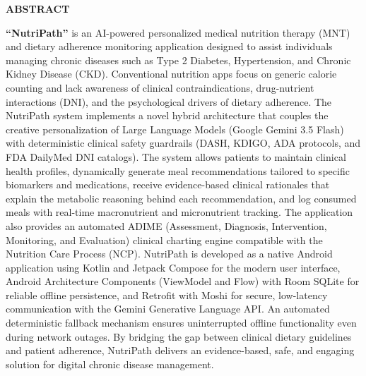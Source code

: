 \documentclass[a4paper,12pt]{report}
\let\mtcontentsname\contentsname
\renewcommand\contentsname{\MakeUppercase\mtcontentsname}
\begin{document}
\begin{center}
    \Large\textbf{ABSTRACT}
\end{center}
\vspace{1cm}
\textbf{``NutriPath''} is an AI-powered personalized medical nutrition therapy (MNT) and dietary adherence monitoring application designed to assist individuals managing chronic diseases such as Type 2 Diabetes, Hypertension, and Chronic Kidney Disease (CKD). Conventional nutrition apps focus on generic calorie counting and lack awareness of clinical contraindications, drug-nutrient interactions (DNI), and the psychological drivers of dietary adherence. The NutriPath system implements a novel hybrid architecture that couples the creative personalization of Large Language Models (Google Gemini 3.5 Flash) with deterministic clinical safety guardrails (DASH, KDIGO, ADA protocols, and FDA DailyMed DNI catalogs). The system allows patients to maintain clinical health profiles, dynamically generate meal recommendations tailored to specific biomarkers and medications, receive evidence-based clinical rationales that explain the metabolic reasoning behind each recommendation, and log consumed meals with real-time macronutrient and micronutrient tracking. The application also provides an automated ADIME (Assessment, Diagnosis, Intervention, Monitoring, and Evaluation) clinical charting engine compatible with the Nutrition Care Process (NCP). NutriPath is developed as a native Android application using Kotlin and Jetpack Compose for the modern user interface, Android Architecture Components (ViewModel and Flow) with Room SQLite for reliable offline persistence, and Retrofit with Moshi for secure, low-latency communication with the Gemini Generative Language API. An automated deterministic fallback mechanism ensures uninterrupted offline functionality even during network outages. By bridging the gap between clinical dietary guidelines and patient adherence, NutriPath delivers an evidence-based, safe, and engaging solution for digital chronic disease management.

\vspace{0.5cm}
\clearpage
\newpage

\tableofcontents
\renewcommand*\contentsname{CONTENTS}

\newpage
\renewcommand{\listfigurename}{LIST OF FIGURES}
\listoffigures
{}
\newpage
\renewcommand{\listtablename}{LIST OF TABLES}
\listoftables
{}
\end{document}
